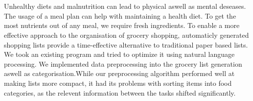 \chapter{\abstractname}
Unhealthy diets and malnutrition can lead to physical aswell as mental deseases. The usage of a meal plan can help with maintaining a health diet. To get the most nutrients out of any meal, we require fresh ingredients. To enable a more effective approach to the organisation of grocery shopping, automaticly generated shopping lists provide a time-effective alternative to traditional paper based lists. We took an existing program and tried to optimize it using natural language processing.
We implemented data preprocessing into the grocery list generation aswell as categorisation.While our preprocessing algorithm performed well at making lists more compact, it had its problems with sorting items into food categories, as the relevent information between the tasks shifted significantly.


